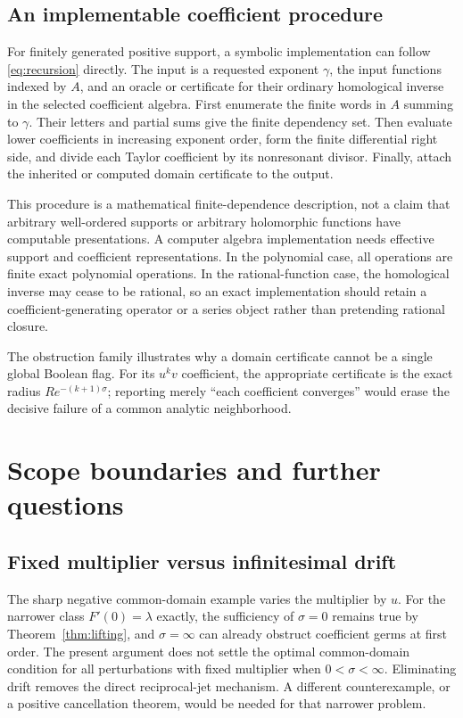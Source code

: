 \documentclass[11pt,a4paper]{article}
\numberwithin{equation}{section}
\theoremstyle{definition}
\theoremstyle{remark}
\begin{document}
\subsection{An implementable coefficient procedure}

For finitely generated positive support, a symbolic implementation can
follow \eqref{eq:recursion} directly. The input is a requested exponent
$\gamma$, the input functions indexed by $A$, and an oracle or certificate
for their ordinary homological inverse in the selected coefficient algebra.
First enumerate the finite words in $A$ summing to $\gamma$. Their letters
and partial sums give the finite dependency set. Then evaluate lower
coefficients in increasing exponent order, form the finite differential
right side, and divide each Taylor coefficient by its nonresonant divisor.
Finally, attach the inherited or computed domain certificate to the output.

This procedure is a mathematical finite-dependence description, not a
claim that arbitrary well-ordered supports or arbitrary holomorphic
functions have computable presentations. A computer algebra implementation
needs effective support and coefficient representations. In the polynomial
case, all operations are finite exact polynomial operations. In the
rational-function case, the homological inverse may cease to be rational,
so an exact implementation should retain a coefficient-generating operator
or a series object rather than pretending rational closure.

The obstruction family illustrates why a domain certificate cannot be a
single global Boolean flag. For its $u^kv$ coefficient, the appropriate
certificate is the exact radius $Re^{-(k+1)\sigma}$; reporting merely
``each coefficient converges'' would erase the decisive failure of a
common analytic neighborhood.

\section{Scope boundaries and further questions}\label{sec:scope}

\subsection{Fixed multiplier versus infinitesimal drift}

The sharp negative common-domain example varies the multiplier by $u$.
For the narrower class $F'(0)=\lambda$ exactly, the sufficiency of
$\sigma=0$ remains true by Theorem~\ref{thm:lifting}, and $\sigma=\infty$
can already obstruct coefficient germs at first order. The present argument
does not settle the optimal common-domain condition for all perturbations
with fixed multiplier when $0<\sigma<\infty$. Eliminating drift removes
the direct reciprocal-jet mechanism. A different counterexample, or a
positive cancellation theorem, would be needed for that narrower problem.
\end{document}
